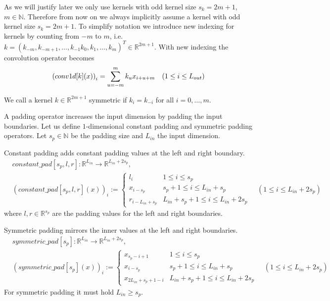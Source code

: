\documentclass[twoside,a4paper]{article}
\begin{document}
As we will justify later we only use kernels with odd kernel size $s_k = 2m+1$, $m \in \mathbb{N}$.
Therefore from now on we always implicitly assume a kernel with odd kernel size $s_k = 2m+1$.
To simplify notation we introduce new indexing for kernels by counting from $-m$ to $m$,
i.e. $k = (k_{-m}, k_{-m+1}, \dots, k_{-1} k_0, k_1, \dots, k_{m})^T \in \mathbb{R}^{2m+1}$.
With new indexing the convolution operator becomes 
\begin{equation*}
	\left( conv1d[k](x) \right)_i = \sum_{u=-m}^{m} k_u x_{i+u+m} \quad
	(1 \leq i \leq L_{out})
\end{equation*}

We call a kernel $k \in \mathbb{R}^{2m+1}$ symmetric if $k_i = k_{-i}$ for all $i = 0, \dots, m$.

A padding operator increases the input dimension by padding
the input boundaries. Let us define $1$-dimensional constant padding and symmetric padding operators.
Let $s_p \in \mathbb{N}$ be the padding size and $L_{in}$ the input dimension.

Constant padding adds constant padding values at the left and right boundary.
\begin{align*}
	&constant\_pad[s_p,l,r] : \mathbb{R}^{L_{in}} \to \mathbb{R}^{L_{in}+2s_p}, \\[7pt]
	&(constant\_pad[s_p,l,r](x))_i :=
	\begin{cases}
		l_i & 1 \leq i \leq s_p \\
		x_{i-s_p} & s_p+1 \leq i \leq L_{in}+s_p \\
		r_{i-L_{in}+s_p} & L_{in}+s_p+1 \leq i \leq L_{in} + 2s_p
	\end{cases}
	\quad (1 \leq i \leq L_{in}+2s_p)
\end{align*}
where $l,r \in \mathbb{R}^{s_p}$ are the padding values for the left and right boundaries.

Symmetric padding mirrors the inner values at the left and right boundaries.
\begin{align*}
	&symmetric\_pad[s_p] : \mathbb{R}^{L_{in}} \to \mathbb{R}^{L_{in}+2s_p}, \\[7pt]
	&(symmetric\_pad[s_p](x))_i :=
	\begin{cases}
		x_{s_p-i+1} & 1 \leq i \leq s_p \\
		x_{i-s_p} & s_p+1 \leq i \leq L_{in}+s_p \\
		x_{2L_{in}+s_p+1-i} & L_{in}+s_p+1 \leq i \leq L_{in} + 2s_p
	\end{cases}
	\quad (1 \leq i \leq L_{in}+2s_p)
\end{align*}
For symmetric padding it must hold $L_{in} \geq s_p$.
\end{document}
